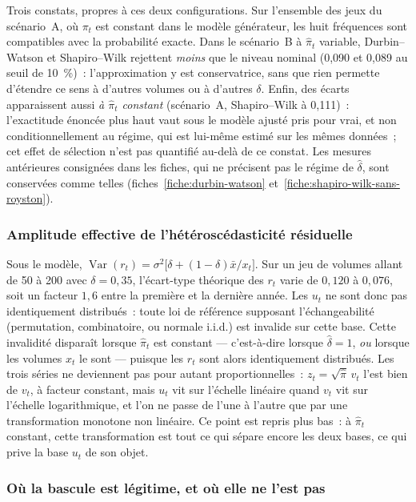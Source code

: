 \documentclass[a4paper,11pt]{article}
\begin{document}
\noindent
Trois constats, propres à ces deux configurations. Sur l'ensemble des jeux du scénario~A, où
$\pi_t$ est constant dans le modèle générateur, les huit fréquences sont compatibles avec la
probabilité exacte. Dans le scénario~B à $\hat\pi_t$ variable, Durbin--Watson et Shapiro--Wilk
rejettent \emph{moins} que le niveau nominal (0,090 et 0,089 au seuil de 10~\%)~: l'approximation
y est conservatrice, sans que rien permette d'étendre ce sens à d'autres volumes ou à d'autres
$\delta$. Enfin, des écarts apparaissent aussi \emph{à $\hat\pi_t$ constant} (scénario~A,
Shapiro--Wilk à 0,111)~: l'exactitude énoncée plus haut vaut sous le modèle ajusté pris pour
vrai, et non conditionnellement au régime, qui est lui-même estimé sur les mêmes données~; cet
effet de sélection n'est pas quantifié au-delà de ce constat. Les mesures antérieures
consignées dans les fiches, qui ne précisent pas le régime de $\hat\delta$, sont conservées
comme telles (fiches~\ref{fiche:durbin-watson} et~\ref{fiche:shapiro-wilk-sans-royston}).

\subsubsection*{Amplitude effective de l'hétéroscédasticité résiduelle}

Sous le modèle, $\operatorname{Var}(r_t) = \sigma^2\big[\delta +
(1-\delta)\bar x/x_t\big]$. Sur un jeu de volumes allant de 50 à 200 avec
$\delta = 0{,}35$, l'écart-type théorique des $r_t$ varie de $0{,}120$ à
$0{,}076$, soit un facteur $1{,}6$ entre la première et la dernière année. Les
$u_t$ ne sont donc pas identiquement distribués~: toute loi de référence
supposant l'échangeabilité (permutation, combinatoire, ou normale i.i.d.) est
invalide sur cette base. Cette invalidité disparaît lorsque $\hat\pi_t$ est
constant --- c'est-à-dire lorsque $\hat\delta = 1$, \emph{ou} lorsque les
volumes $x_t$ le sont --- puisque les $r_t$ sont alors identiquement
distribués. Les trois séries ne deviennent pas pour autant proportionnelles~:
$z_t = \sqrt{\hat\pi}\,v_t$ l'est bien de $v_t$, à facteur constant, mais $u_t$
vit sur l'échelle linéaire quand $v_t$ vit sur l'échelle logarithmique, et
l'on ne passe de l'une à l'autre que par une transformation monotone non
linéaire. Ce point est repris plus bas~: à $\hat\pi_t$ constant, cette
transformation est tout ce qui sépare encore les deux bases, ce qui prive la
base $u_t$ de son objet.

\subsubsection*{Où la bascule est légitime, et où elle ne l'est pas}
\end{document}
